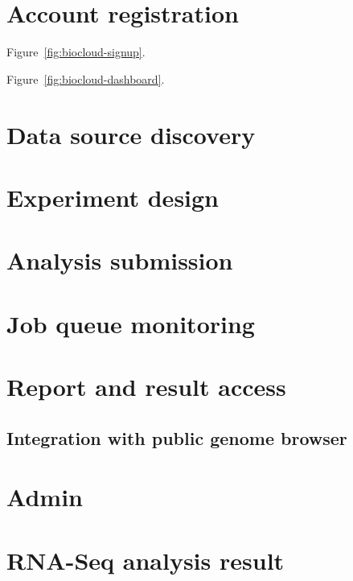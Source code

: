 \section{Account registration}

Figure~\ref{fig:biocloud-signup}.



Figure~\ref{fig:biocloud-dashboard}.




\section{Data source discovery}


\section{Experiment design}


\section{Analysis submission}


\section{Job queue monitoring}


\section{Report and result access}

\subsection{Integration with public genome browser}


\section{Admin}


\section{RNA-Seq analysis result}


